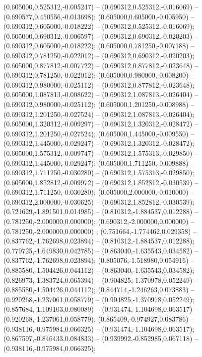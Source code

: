  (0.605000,0.525312,-0.005247) -- (0.690312,0.525312,-0.016069) -- (0.690577,0.450556,-0.013698);
 (0.605000,0.605000,-0.005950) -- (0.690312,0.605000,-0.018222) -- (0.690312,0.525312,-0.016069);
 (0.605000,0.690312,-0.006597) -- (0.690312,0.690312,-0.020203) -- (0.690312,0.605000,-0.018222);
 (0.605000,0.781250,-0.007188) -- (0.690312,0.781250,-0.022012) -- (0.690312,0.690312,-0.020203);
 (0.605000,0.877812,-0.007722) -- (0.690312,0.877812,-0.023648) -- (0.690312,0.781250,-0.022012);
 (0.605000,0.980000,-0.008200) -- (0.690312,0.980000,-0.025112) -- (0.690312,0.877812,-0.023648);
 (0.605000,1.087813,-0.008622) -- (0.690312,1.087813,-0.026404) -- (0.690312,0.980000,-0.025112);
 (0.605000,1.201250,-0.008988) -- (0.690312,1.201250,-0.027524) -- (0.690312,1.087813,-0.026404);
 (0.605000,1.320312,-0.009297) -- (0.690312,1.320312,-0.028472) -- (0.690312,1.201250,-0.027524);
 (0.605000,1.445000,-0.009550) -- (0.690312,1.445000,-0.029247) -- (0.690312,1.320312,-0.028472);
 (0.605000,1.575312,-0.009747) -- (0.690312,1.575313,-0.029850) -- (0.690312,1.445000,-0.029247);
 (0.605000,1.711250,-0.009888) -- (0.690312,1.711250,-0.030280) -- (0.690312,1.575313,-0.029850);
 (0.605000,1.852812,-0.009972) -- (0.690312,1.852812,-0.030539) -- (0.690312,1.711250,-0.030280);
 (0.605000,2.000000,-0.010000) -- (0.690312,2.000000,-0.030625) -- (0.690312,1.852812,-0.030539);
 (0.721629,-1.891501,0.014985) -- (0.810312,-1.884537,0.012288) -- (0.781250,-2.000000,0.000000);
 (0.690312,-2.000000,0.000000) -- (0.781250,-2.000000,0.000000) ;
 (0.751664,-1.774462,0.029358) -- (0.837762,-1.762698,0.023894) -- (0.810312,-1.884537,0.012288);
 (0.779725,-1.649830,0.042785) -- (0.863040,-1.635543,0.034582) -- (0.837762,-1.762698,0.023894);
 (0.805076,-1.518980,0.054916) -- (0.885580,-1.504426,0.044112) -- (0.863040,-1.635543,0.034582);
 (0.826973,-1.383724,0.065394) -- (0.904825,-1.370978,0.052249) -- (0.885580,-1.504426,0.044112);
 (0.844714,-1.246263,0.073883) -- (0.920268,-1.237061,0.058779) -- (0.904825,-1.370978,0.052249);
 (0.857684,-1.109103,0.080089) -- (0.931474,-1.104698,0.063517) -- (0.920268,-1.237061,0.058779);
 (0.865409,-0.974927,0.083786) -- (0.938116,-0.975984,0.066325) -- (0.931474,-1.104698,0.063517);
 (0.867597,-0.846433,0.084833) -- (0.939992,-0.852985,0.067118) -- (0.938116,-0.975984,0.066325);
